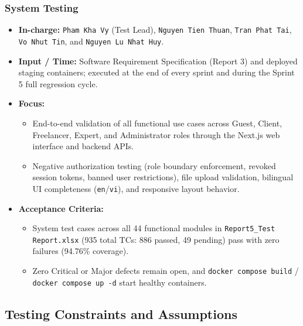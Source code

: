 \documentclass[12pt,a4paper]{article}
\begin{document}
\subsubsection{System Testing}
\begin{itemize}
  \item \textbf{In-charge:} \texttt{Pham Kha Vy} (Test Lead), \texttt{Nguyen Tien Thuan}, \texttt{Tran Phat Tai}, \texttt{Vo Nhut Tin}, and \texttt{Nguyen Lu Nhat Huy}.
  \item \textbf{Input / Time:} Software Requirement Specification (Report 3) and deployed staging containers; executed at the end of every sprint and during the Sprint 5 full regression cycle.
  \item \textbf{Focus:}
  \begin{itemize}
    \item End-to-end validation of all functional use cases across Guest, Client, Freelancer, Expert, and Administrator roles through the Next.js web interface and backend APIs.
    \item Negative authorization testing (role boundary enforcement, revoked session tokens, banned user restrictions), file upload validation, bilingual UI completeness (\texttt{en}/\texttt{vi}), and responsive layout behavior.
  \end{itemize}
  \item \textbf{Acceptance Criteria:}
  \begin{itemize}
    \item {\sloppy System test cases across all 44 functional modules in \texttt{Report5\_Test Report.xlsx} (935 total TCs: 886 passed, 49 pending) pass with zero failures (94.76\% coverage).\par}
    \item {\sloppy Zero Critical or Major defects remain open, and \texttt{docker compose build} / \texttt{docker compose up -d} start healthy containers.\par}
  \end{itemize}
\end{itemize}

\subsection{Testing Constraints and Assumptions}
\end{document}
